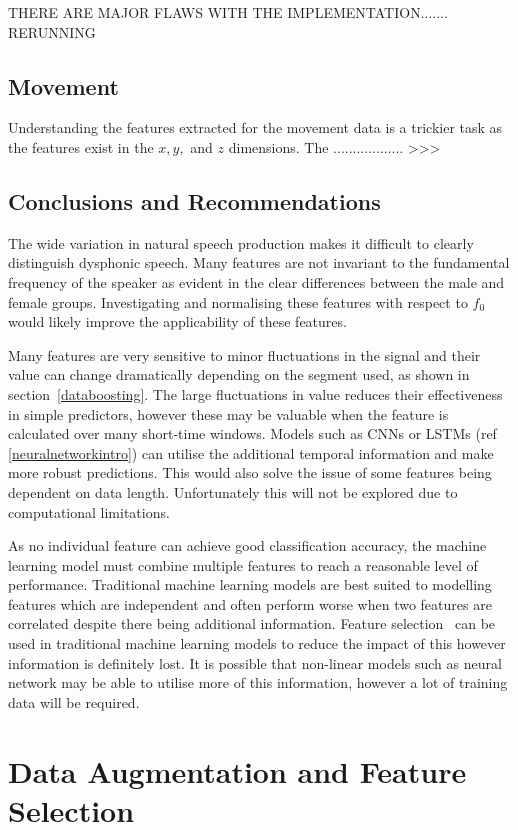 \documentclass[12pt, twoside]{book}
\begin{document}
THERE ARE MAJOR FLAWS WITH THE IMPLEMENTATION....... RERUNNING

\subsection{Movement}
Understanding the features extracted for the movement data is a trickier task as the features exist in the $x, y,$ and $z$ dimensions. The .................. >>>


\subsection{Conclusions and Recommendations}
\label{visfeatrecommendations}
The wide variation in natural speech production makes it difficult to clearly distinguish dysphonic speech. Many features are not invariant to the fundamental frequency of the speaker as evident in the clear differences between the male and female groups. Investigating and normalising these features with respect to $f_0$ would likely improve the applicability of these features.

Many features are very sensitive to minor fluctuations in the signal and their value can change dramatically depending on the segment used, as shown in section~\ref{databoosting}. The large fluctuations in value reduces their effectiveness in simple predictors, however these may be valuable when the feature is calculated over many short-time windows. Models such as CNNs or LSTMs (ref \ref{neuralnetworkintro}) can utilise the additional temporal information and make more robust predictions. This would also solve the issue of some features being dependent on data length. Unfortunately this will not be explored due to computational limitations.

As no individual feature can achieve good classification accuracy, the machine learning model must combine multiple features to reach a reasonable level of performance. Traditional machine learning models are best suited to modelling features which are independent and often perform worse when two features are correlated despite there being additional information. Feature selection~\cite{skfeature} can be used in traditional machine learning models to reduce the impact of this however information is definitely lost. It is possible that non-linear models such as neural network may be able to utilise more of this information, however a lot of training data will be required.

\section{Data Augmentation and Feature Selection}
\end{document}
